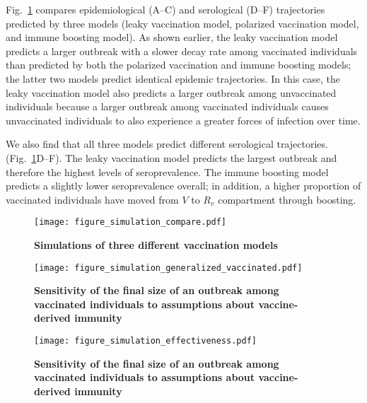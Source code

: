 \documentclass[12pt]{article}
\newcommand{\fref}[1]{Fig.~\ref{fig:#1}}
\begin{document}
\fref{simulation} compares epidemiological (A--C) and serological (D--F) trajectories predicted by three models (leaky vaccination model, polarized vaccination model, and immune boosting model).
As shown earlier, the leaky vaccination model predicts a larger outbreak with a slower decay rate among vaccinated individuals than predicted by both the polarized vaccination and immune boosting models;
the latter two models predict identical epidemic trajectories.
In this case, the leaky vaccination model also predicts a larger outbreak among unvaccinated individuals because a larger outbreak among vaccinated individuals causes unvaccinated individuals to also experience a greater forces of infection over time.

We also find that all three models predict different serological trajectories. (\fref{simulation}D--F).
The leaky vaccination model predicts the largest outbreak and therefore the highest levels of seroprevalence.
The immune boosting model predicts a slightly lower seroprevalence overall;
in addition, a higher proportion of vaccinated individuals have moved from $V$ to $R_v$ compartment through boosting.


\begin{figure}[!th]
\texttt{[image: figure\_simulation\_compare.pdf]}
\caption{
\textbf{Simulations of three different vaccination models}
\label{fig:simulation}
}
\end{figure}



\begin{figure}[!th]
\texttt{[image: figure\_simulation\_generalized\_vaccinated.pdf]}
\caption{
\textbf{Sensitivity of the final size of an outbreak among vaccinated individuals to assumptions about vaccine-derived immunity}
\label{fig:new}
}
\end{figure}


\begin{figure}[!th]
\texttt{[image: figure\_simulation\_effectiveness.pdf]}
\caption{
\textbf{Sensitivity of the final size of an outbreak among vaccinated individuals to assumptions about vaccine-derived immunity}
\label{fig:new2}
}
\end{figure}
\end{document}
